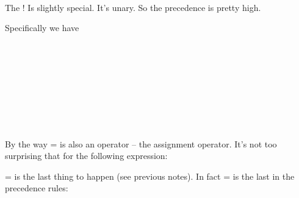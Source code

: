 \\
\tab[3em]{$<, <=, >, >=, !=, ==$}

The ! Is slightly special. It's unary. So the precedence is pretty high.

Specifically we have

\\
\tab[3em]{!}\\
\tab[3em]{*, /, \%}\\
\\
\tab[3em]{$<, <=, >, >=$}\\
\tab[3em]{$==, !=$}\\
\tab[3em]{\&\&}\\
\\

By the way = is also an operator – the assignment operator. It's not too
surprising that for the following expression:


= is the last thing to happen (see previous notes). In fact = is the last in
the precedence rules:

